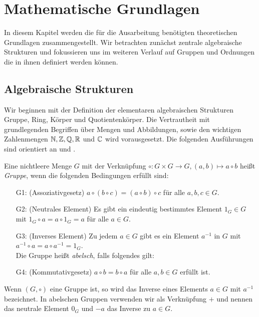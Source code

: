 \chapter{Mathematische Grundlagen}
In diesem Kapitel werden die für die Ausarbeitung benötigten theoretischen Grundlagen zusammengestellt. Wir betrachten zunächst zentrale algebraische Strukturen und fokussieren uns im weiteren Verlauf auf Gruppen und Ordnungen die in ihnen definiert werden können.
\section{Algebraische Strukturen}
Wir beginnen mit der Definition der elementaren algebraischen Strukturen Gruppe, Ring, Körper und Quotientenkörper. Die Vertrautheit mit grundlegenden Begriffen über Mengen und Abbildungen, sowie den wichtigen Zahlenmengen $\mathbb{N}, \mathbb{Z}, \mathbb{Q}, \mathbb{R}$ und $\mathbb{C}$ wird vorausgesetzt. Die folgenden Ausführungen sind orientiert an \cite{rainer08} und \cite{fischer08}.
%
\begin{defn}\label{Gruppe}
Eine nichtleere Menge $G$ mit der Verknüpfung $\circ \colon G \times G \rightarrow G, \left( a, b\right) \mapsto a \circ b$ heißt \textit{Gruppe}, wenn die folgenden Bedingungen erfüllt sind:
\begin{enumerate}
\item[G1: ] (Assoziativgesetz) $a\circ \left(b\circ c\right) = \left(a\circ b\right) \circ c$ für alle $a, b, c \in G$.
\item[G2: ] (Neutrales Element) Es gibt ein eindeutig bestimmtes Element $1_G \in G$ mit $1_G \circ a  = a \circ 1_G = a$ für alle $a \in G$.
\item[G3: ] (Inverses Element) Zu jedem $a \in G$ gibt es ein Element $a^{-1}$ in $G$ mit $a^{-1} \circ a = a \circ a^{-1} = 1_G$. \\
Die Gruppe heißt \textit{abelsch}, falls folgendes gilt: 
\item[G4: ] (Kommutativgesetz) $a \circ b = b \circ a$ für alle $a, b \in G$ erfüllt ist.  
\end{enumerate} 
\end{defn}
%
%
\begin{bem}
Wenn $\left(G, \circ\right)$ eine Gruppe ist, so wird das Inverse eines Elements $a\in G$ mit $a^{-1}$ bezeichnet. In abelschen Gruppen verwenden wir als Verknüpfung $+$ und nennen das neutrale Element $0_G$ und $-a$ das Inverse zu $a\in G$. 
\end{bem}

